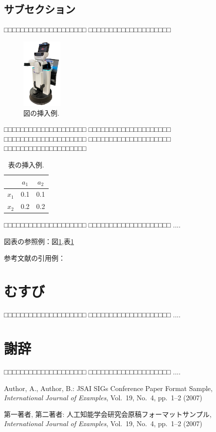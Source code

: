\documentclass[a4j]{jarticle}
\begin{document}
\subsection{サブセクション}
□□□□□□□□□□□□□□□□□□□□
□□□□□□□□□□□□□□□□□□□□
%
\begin{figure}[ht]
  \centering
  \includegraphics[width=2cm]{images/hsr_front.png}
  \caption{図の挿入例.}
  \label{fig:ex1}
\end{figure}
%
□□□□□□□□□□□□□□□□□□□□
□□□□□□□□□□□□□□□□□□□□
□□□□□□□□□□□□□□□□□□□□
□□□□□□□□□□□□□□□□□□□□
□□□□□□□□□□□□□□□□□□□□
%
\begin{table}[h]
  \centering
  \caption {表の挿入例.}
  \label{table:ex1}
  \begin{tabular}{c|cc}
    \hline
           & $a_1$ & $a_2$ \\ \hline
    $x_1$  &  0.1  &  0.1  \\
    $x_2$  &  0.2  &  0.2  \\ \hline
  \end{tabular}
\end{table}
%
□□□□□□□□□□□□□□□□□□□□
□□□□□□□□□□□□□□□□□□□□
....

図表の参照例：図\ref{fig:ex1},表\ref{fig:ex1}

参考文献の引用例：\cite{Sample1}\cite{Sample2}


\section{むすび}
□□□□□□□□□□□□□□□□□□□□
□□□□□□□□□□□□□□□□□□□□
....


\section*{謝辞}

□□□□□□□□□□□□□□□□□□□□
□□□□□□□□□□□□□□□□□□□□
....


\begin{thebibliography}{99}

Author, A., Author, B.:
JSAI SIGs Conference Paper Format Sample,
{\it International Journal of Examples}, Vol.~19, No.~4, pp.~1--2 (2007)

第一著者, 第二著者:
人工知能学会研究会原稿フォーマットサンプル,
{\it International Journal of Examples}, Vol.~19, No.~4, pp.~1--2 (2007)

\end{thebibliography}
\end{document}
